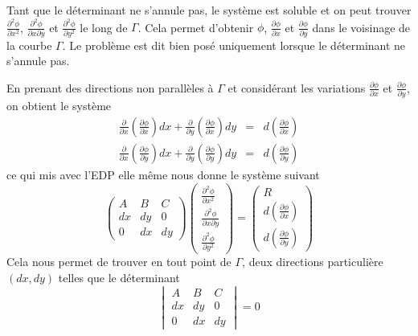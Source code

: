 Tant que le déterminant ne s'annule pas, le système est soluble et on peut trouver $\frac{\partial ^2 \phi}{\partial x^2}$, $\frac{\partial ^2 \phi}{\partial x \partial y}$ et $\frac{\partial ^2 \phi}{\partial y^2}$ le long de $\Gamma$. Cela permet d'obtenir $\phi$, $\frac{\partial \phi}{\partial x} $ et $\frac{\partial \phi}{\partial y}$ dans le voisinage de la courbe $\Gamma$. Le problème est dit bien posé uniquement lorsque le déterminant ne s'annule pas.

En prenant des directions non parallèles à $\Gamma$ et considérant les variations $\frac{\partial \phi}{\partial x}$ et $\frac{\partial \phi}{\partial y}$, on obtient le système 
\begin{eqnarray}
\frac{\partial}{\partial x}\left(\frac{\partial \phi}{\partial x}\right)dx +\frac{\partial}{\partial y}\left(\frac{\partial \phi}{\partial x}\right)dy & = & d\left(\frac{\partial \phi}{\partial x}\right)\\
\frac{\partial}{\partial x}\left(\frac{\partial \phi}{\partial y}\right)dx +\frac{\partial}{\partial y}\left(\frac{\partial \phi}{\partial y}\right)dy & = & d\left(\frac{\partial \phi}{\partial y}\right)
\end{eqnarray}
ce qui mis avec l'EDP elle même nous donne le système suivant
\begin{equation}
\begin{pmatrix}
A & B & C\\
dx & dy & 0 \\
0 & dx & dy
\end{pmatrix}
\begin{pmatrix}
\frac{\partial ^2 \phi}{\partial x^2}\\
\frac{\partial ^2 \phi}{\partial x \partial y}\\
\frac{\partial ^2 \phi}{\partial y^2}
\end{pmatrix}
=
\begin{pmatrix}
R \\
d\left(\frac{\partial \phi}{\partial x}\right) \\
d\left(\frac{\partial \phi}{\partial y}\right)
\end{pmatrix}
\end{equation}
Cela nous permet de trouver en tout point de $\Gamma$, deux directions particulière $(dx, dy)$ telles que le déterminant 
\begin{equation}
\begin{vmatrix}
A & B & C \\
dx & dy & 0 \\
0 & dx & dy
\end{vmatrix}
=0
\end{equation}
